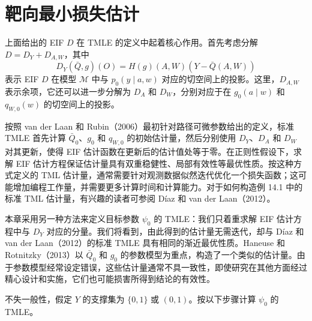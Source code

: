 \section{靶向最小损失估计}

上面给出的 EIF $D$ 在 TMLE 的定义中起着核心作用。首先考虑分解 $D=D_Y+D_{A,W}$，其中
\[
 D_Y(\bar Q,g)(O)=H(g)(A,W)(Y-\bar Q(A,W))
\]
表示 EIF $D$ 在模型 $\mathcal M$ 中与 $p_0(y\mid a,w)$ 对应的切空间上的投影。这里，$D_{A,W}$ 表示余项，它还可以进一步分解为 $D_A$ 和 $D_W$，分别对应于在 $g_0(a\mid w)$ 和 $q_{W,0}(w)$ 的切空间上的投影。

按照 van der Laan 和 Rubin（2006）最初针对路径可微参数给出的定义，标准 TMLE 首先计算 $\bar Q_0$、$g_0$ 和 $q_{W,0}$ 的初始估计量，然后分别使用 $D_Y$、$D_A$ 和 $D_W$ 对其更新，使得 EIF 估计函数在更新后的估计值处等于零。在正则性假设下，求解 EIF 估计方程保证估计量具有双重稳健性、局部有效性等最优性质。按这种方式定义的 TML 估计量，通常需要针对观测数据似然迭代优化一个损失函数；这可能增加编程工作量，并需要更多计算时间和计算能力。对于如何构造例 14.1 中的标准 TML 估计量，有兴趣的读者可参阅 Díaz 和 van der Laan（2012）。

本章采用另一种方法来定义目标参数 $\psi_0$ 的 TMLE：我们只着重求解 EIF 估计方程中与 $D_Y$ 对应的分量。我们将看到，由此得到的估计量无需迭代，却与 Díaz 和 van der Laan（2012）的标准 TMLE 具有相同的渐近最优性质。Haneuse 和 Rotnitzky（2013）以 $\bar Q_0$ 和 $g_0$ 的参数模型为重点，构造了一个类似的估计量。由于参数模型经常设定错误，这些估计量通常不具一致性，即使研究在其他方面经过精心设计和实施，它们也可能损害所得到结论的有效性。

不失一般性，假定 $Y$ 的支撑集为 $\{0,1\}$ 或 $(0,1)$。按以下步骤计算 $\psi_0$ 的 TMLE。

